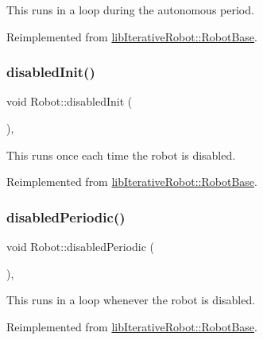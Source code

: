 This runs in a loop during the autonomous period. 

Reimplemented from \mbox{\hyperlink{classlib_iterative_robot_1_1_robot_base_ac34d3dcb9388d4a8564eb781919eb825}{lib\+Iterative\+Robot\+::\+Robot\+Base}}.

\mbox{\label{class_robot_a34f8bfa41ab64deae701c5583f619e78}} 
\subsubsection{\texorpdfstring{disabledInit()}{disabledInit()}}
{\footnotesize\ttfamily void Robot\+::disabled\+Init (\begin{DoxyParamCaption}{ }\end{DoxyParamCaption})\hspace{0.3cm}{\ttfamily [protected]}, {\ttfamily [virtual]}}

This runs once each time the robot is disabled. 

Reimplemented from \mbox{\hyperlink{classlib_iterative_robot_1_1_robot_base_a12cfc52a6bac5b5a9ad7e61b47e9ecd2}{lib\+Iterative\+Robot\+::\+Robot\+Base}}.

\mbox{\label{class_robot_a9d35b3c9b4de467c7435d0cc6f17b33b}} 
\subsubsection{\texorpdfstring{disabledPeriodic()}{disabledPeriodic()}}
{\footnotesize\ttfamily void Robot\+::disabled\+Periodic (\begin{DoxyParamCaption}{ }\end{DoxyParamCaption})\hspace{0.3cm}{\ttfamily [protected]}, {\ttfamily [virtual]}}

This runs in a loop whenever the robot is disabled. 

Reimplemented from \mbox{\hyperlink{classlib_iterative_robot_1_1_robot_base_a8e1e85e215343baaaf3bdeedb89d9890}{lib\+Iterative\+Robot\+::\+Robot\+Base}}.

\mbox{\label{class_robot_a0ade19d412e58249d9f7a138d306130c}} 
